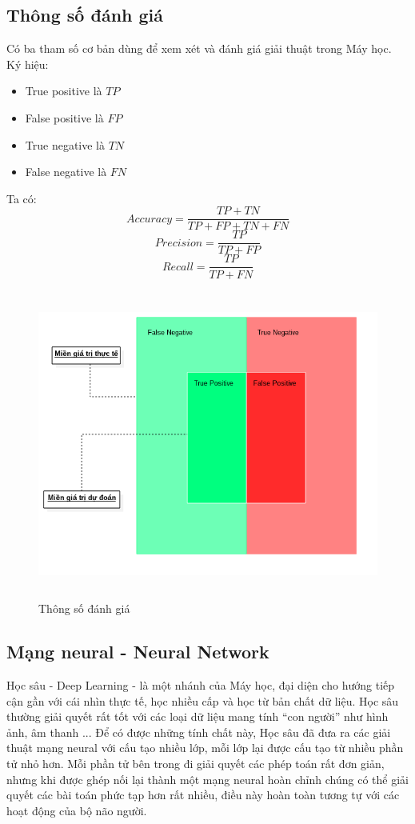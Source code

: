 \subsection{Thông số đánh giá}
Có ba tham số cơ bản dùng để xem xét và đánh giá giải thuật trong Máy học.
Ký hiệu:
\begin{itemize}
\item True positive là $TP$
\item False positive là $FP$
\item True negative là $TN$
\item False negative là $FN$
\end{itemize}
Ta có:\\
\[
  Accuracy = \frac{TP+TN}{TP+FP+TN+FN}
\]
\[
  Precision = \frac{TP}{TP+FP}
\]
\[
  Recall = \frac{TP}{TP+FN}
\]
\begin{figure}[h!]
\centering
\includegraphics[height=4in, keepaspectratio=true]{precision_recall.png}
\caption{Thông số đánh giá}
\end{figure}
\subsection{Mạng neural - Neural Network}
Học sâu - Deep Learning - là một nhánh của Máy học, đại diện cho hướng tiếp 
cận gần với cái nhìn thực tế, học nhiều cấp và học từ bản chất dữ liệu. Học 
sâu thường giải quyết rất tốt với các loại dữ liệu mang tính ``con người'' 
như hình ảnh, âm thanh ... Để có được những tính chất này, Học sâu đã đưa ra 
các giải thuật mạng neural với cấu tạo nhiều lớp, mỗi lớp lại được cấu tạo từ 
nhiều phần tử nhỏ hơn. Mỗi phần tử bên trong đi giải quyết các phép toán rất 
đơn giản, nhưng khi được ghép nối lại thành một mạng neural hoàn chỉnh chúng có 
thể giải quyết các bài toán phức tạp hơn rất nhiều, điều này hoàn toàn tương tự 
với các hoạt động của bộ não người. \cite{NeuralNetworksandDeepLearning} 
